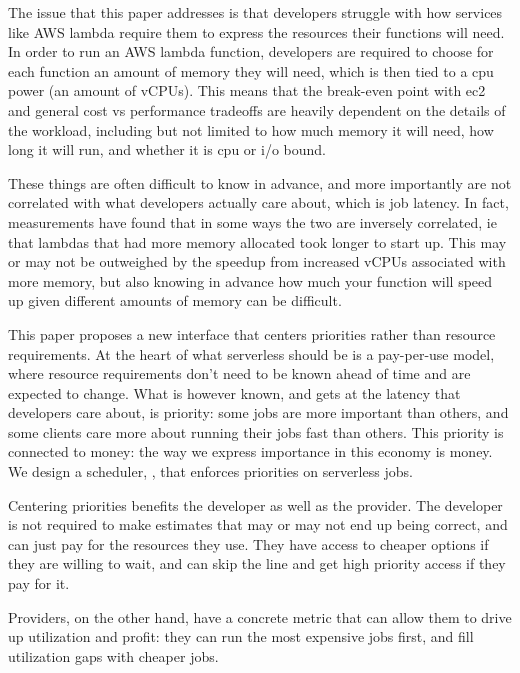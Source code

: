 The issue that this paper addresses is that developers struggle with how
services like AWS lambda require them to express the resources their functions
will need. 
In order to run an AWS lambda function, developers are required to choose for
each function an amount of memory they will need, which is then tied to a cpu
power (an amount of vCPUs). This means that the break-even point with ec2 and
general cost vs performance tradeoffs are heavily dependent on the details of
the workload, including but not limited to how much memory it will need, how
long it will run, and whether it is cpu or i/o bound. 

These things are often difficult to know in advance, and more importantly are
not correlated with what developers actually care about, which is job latency.
In fact, measurements have found that in some ways the two are inversely
correlated, ie that lambdas that had more memory allocated took longer to start
up. 
This may or may not be outweighed by the speedup from increased vCPUs associated
with more memory, but also knowing in advance how much your function will speed
up given different amounts of memory can be difficult.


This paper proposes a new interface that centers priorities rather than resource
requirements. At the heart of what serverless should be is a pay-per-use model,
where resource requirements don't need to be known ahead of time and are
expected to change. What is however known, and gets at the latency that
developers care about, is priority: some jobs are more important than others,
and some clients care more about running their jobs fast than others. This
priority is connected to money: the way we express importance in this economy is
money.
We design a scheduler, \sys{}, that enforces priorities on serverless jobs.



Centering priorities benefits the developer as well as the provider. The
developer is not required to make estimates that may or may not end up being
correct, and can just pay for the resources they use. They have access to
cheaper options if they are willing to wait, and can skip the line and get high
priority access if they pay for it.

Providers, on the other hand, have a concrete metric that can allow them to
drive up utilization and profit: they can run the most expensive jobs first, and
fill utilization gaps with cheaper jobs. 

